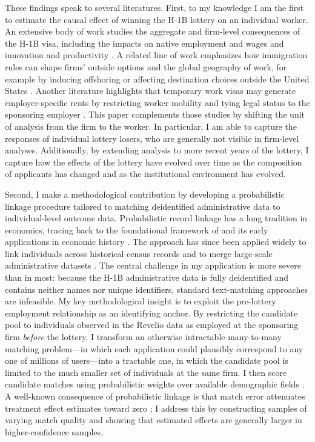 These findings speak to several literatures. First, to my knowledge I am the first to estimate the causal effect of winning the H-1B lottery on an individual worker. An extensive body of work studies the aggregate and firm-level consequences of the H-1B visa, including the impacts on native employment and wages \citep{kerr_kerr_lincoln_2015, peri_shih_sparber_2015_lottery,doranetal2022,mahajanetal2024} and innovation and productivity \citep{kerrlincoln2010,peri_shih_sparber_2015_stem,dimmock_huang_weisbenner_2022, mayda_etal_2023}. 
A related line of work emphasizes how immigration rules can shape firms' outside options and the global geography of work, for example by inducing offshoring or affecting destination choices outside the United States \citep{ khannamorales2017, brinattiguo2023,glennon2024}. Another literature highlights that temporary work visas may generate employer-specific rents by restricting worker mobility and tying legal status to the sponsoring employer \citep{kimpei2022}. This paper complements those studies by shifting the unit of analysis from the firm to the worker. In particular, I am able to capture the responses of individual lottery losers, who are generally not visible in firm-level analyses. Additionally, by extending analysis to more recent years of the lottery, I capture how the effects of the lottery have evolved over time as the composition of applicants has changed and as the institutional environment has evolved.

Second, I make a methodological contribution by developing a probabilistic linkage procedure tailored to matching deidentified administrative data to individual-level outcome data. Probabilistic record linkage has a long tradition in economics, tracing back to the foundational framework of \citet{fellegisunter1969} and its early applications in economic history \citep{ferrie1996}. The approach has since been applied widely to link individuals across historical census records \citep{abramitzkyboustanerikkson2014, feigenbaum2016, abramitzkyetal2021, baileyetal2020} and to merge large-scale administrative datasets \citep{enamoradoetal2019}. The central challenge in my application is more severe than in most: because the H-1B administrative data is fully deidentified and contains neither names nor unique identifiers, standard text-matching approaches are infeasible. My key methodological insight is to exploit the pre-lottery employment relationship as an identifying anchor. By restricting the candidate pool to individuals observed in the Revelio data as employed at the sponsoring firm \textit{before} the lottery, I transform an otherwise intractable many-to-many matching problem---in which each application could plausibly correspond to any one of millions of users---into a tractable one, in which the candidate pool is limited to the much smaller set of individuals at the same firm. I then score candidate matches using probabilistic weights over available demographic fields \citep{enamoradoetal2019}. A well-known consequence of probabilistic linkage is that match error attenuates treatment effect estimates toward zero \citep{baileyetal2020, abramitzkyetal2021}; I address this by constructing samples of varying match quality and showing that estimated effects are generally larger in higher-confidence samples.

